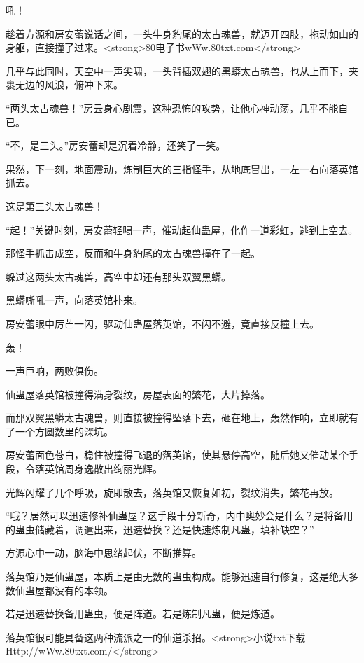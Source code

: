 
\begin{this_body}

吼！

趁着方源和房安蕾说话之间，一头牛身豹尾的太古魂兽，就迈开四肢，拖动如山的身躯，直接撞了过来。<strong>80电子书wWw.80txt.com</strong>

几乎与此同时，天空中一声尖啸，一头背插双翅的黑蟒太古魂兽，也从上而下，夹裹无边的风浪，俯冲下来。

“两头太古魂兽！”房云身心剧震，这种恐怖的攻势，让他心神动荡，几乎不能自已。

“不，是三头。”房安蕾却是沉着冷静，还笑了一笑。

果然，下一刻，地面震动，炼制巨大的三指怪手，从地底冒出，一左一右向落英馆抓去。

这是第三头太古魂兽！

“起！”关键时刻，房安蕾轻喝一声，催动起仙蛊屋，化作一道彩虹，逃到上空去。

那怪手抓击成空，反而和牛身豹尾的太古魂兽撞在了一起。

躲过这两头太古魂兽，高空中却还有那头双翼黑蟒。

黑蟒嘶吼一声，向落英馆扑来。

房安蕾眼中厉芒一闪，驱动仙蛊屋落英馆，不闪不避，竟直接反撞上去。

轰！

一声巨响，两败俱伤。

仙蛊屋落英馆被撞得满身裂纹，房屋表面的繁花，大片掉落。

而那双翼黑蟒太古魂兽，则直接被撞得坠落下去，砸在地上，轰然作响，立即就有了一个方圆数里的深坑。

房安蕾面色苍白，稳住被撞得飞退的落英馆，使其悬停高空，随后她又催动某个手段，令落英馆周身逸散出绚丽光辉。

光辉闪耀了几个呼吸，旋即散去，落英馆又恢复如初，裂纹消失，繁花再放。

“哦？居然可以迅速修补仙蛊屋？这手段十分新奇，内中奥妙会是什么？是将备用的蛊虫储藏着，调遣出来，迅速替换？还是快速炼制凡蛊，填补缺空？”

方源心中一动，脑海中思绪起伏，不断推算。

落英馆乃是仙蛊屋，本质上是由无数的蛊虫构成。能够迅速自行修复，这是绝大多数仙蛊屋都没有的本领。

若是迅速替换备用蛊虫，便是阵道。若是炼制凡蛊，便是炼道。

落英馆很可能具备这两种流派之一的仙道杀招。<strong>小说txt下载Http://wWw.80txt.com/</strong>


\end{this_body}
